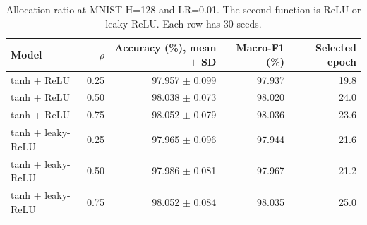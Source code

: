 \begin{table}[htbp]
\centering
\caption{Allocation ratio at MNIST H=128 and LR=0.01. The second function is ReLU or leaky-ReLU. Each row has 30 seeds.}
\label{tab:ratios}
\footnotesize
\begin{tabular}{@{}lrrrr@{}}
\toprule
Model & $\rho$ & Accuracy (\%), mean $\pm$ SD & Macro-F1 (\%) & Selected epoch \\
\midrule
tanh + ReLU & 0.25 & 97.957 $\pm$ 0.099 & 97.937 & 19.8 \\
tanh + ReLU & 0.50 & 98.038 $\pm$ 0.073 & 98.020 & 24.0 \\
tanh + ReLU & 0.75 & 98.052 $\pm$ 0.079 & 98.036 & 23.6 \\
tanh + leaky-ReLU & 0.25 & 97.965 $\pm$ 0.096 & 97.944 & 21.6 \\
tanh + leaky-ReLU & 0.50 & 97.986 $\pm$ 0.081 & 97.967 & 21.2 \\
tanh + leaky-ReLU & 0.75 & 98.052 $\pm$ 0.084 & 98.035 & 25.0 \\
\bottomrule
\end{tabular}
\end{table}
